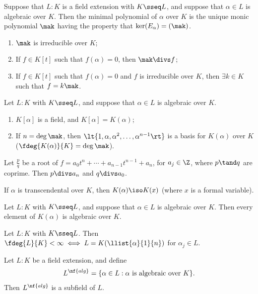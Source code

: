 \documentclass[a4paper]{article}
\begin{document}
\begin{tdefinition}
  Suppose that \( L : K \) is a field extension with \( K \sseq L \), and suppose that \( \alpha\in L \) is algebraic over \( K \).
  Then the minimal polynomial of \( \alpha \) over \( K \) is the unique monic polynomial \( \mak \) having the property that \( \ker(E_\alpha) = (\mak) \).
\end{tdefinition}

\begin{tlemma}
  \begin{enumerate}
    \item \( \mak \) is irreducible over \( K \);
    \item If \( f\in K[t] \) such that \( f(\alpha) = 0 \), then \( \mak\divs f \);
    \item If \( f\in K[t] \) such that \( f(\alpha) = 0 \) and \( f \) is irreducible over \( K \), then \( \exists k\in K \) such that \( f=k\mak \).
  \end{enumerate}
\end{tlemma}

\begin{ttheorem}
  Let \( L : K \) with \( K \sseq L \), and suppose that \( \alpha\in L \) is algebraic over \( K \).
  \begin{enumerate}[label=(\roman*)]
    \item \( K[\alpha] \) is a field, and \( K[\alpha] = K(\alpha) \);
    \item If \( n=\deg \mak \), then \( \lt\{ 1,\alpha,\alpha^2,\ldots,\alpha^{n-1} \rt\} \) is a basis for \( K(\alpha) \) over \( K \) (\imp \( \fdeg{K(\alpha)}{K}=\deg \mak \)).
  \end{enumerate}
\end{ttheorem}

\begin{ttheorem}
  Let \( \frac{p}{q} \) be a root of \( f= a_0t^n+\cdots + a_{n-1} t^{n-1} + a_n \), for \( a_j\in\Z \), where \( p\tand q \) are coprime.
  Then \( p\divs a_n \) and \( q\divs a_0 \).
\end{ttheorem}

\quad If \( \alpha \) is transcendental over \( K \), then \( K(\alpha)\iso K(x) \) (where \( x \) is a formal variable).

\begin{tcorollary}
  Let \( L : K \) with \( K \sseq L \), and suppose that \( \alpha\in L \) is algebraic over \( K \).
  Then every element of \( K(\alpha) \) is algebraic over \( K \).
\end{tcorollary}

\begin{tcorollary}
  Let \( L:K \) with \( K\sseq L \).
  Then \( \fdeg{L}{K} < \infty \iff L=K(\llist{\alpha}{1}{n}) \) for \( \alpha_j\in L \).
\end{tcorollary}

\begin{ttheorem}
  Let \( L:K \) be a field extension, and define \begin{align*}
    L^{\nf{alg}}=\{\alpha\in L : \alpha \text{ is algebraic over } K\}.
  \end{align*}
  Then \( L^{\nf{alg}} \) is a subfield of \( L \).
\end{ttheorem}
\end{document}
